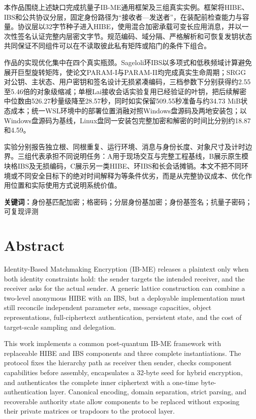 \documentclass[UTF8,a4paper,12pt,oneside,openany,fontset=fandol]{ctexrep}
\begin{document}
本作品围绕上述缺口完成抗量子IB-ME通用框架及三组真实实例。框架将HIBE、IBS和公共协议分层，固定身份路径为“接收者—发送者”，在装配前检查能力与容量。协议层以32字节种子进入HIBE，使用混合加密承载可变长应用消息，并以一次性签名认证完整内层密文字节。规范编码、域分隔、严格解析和可恢复发钥状态共同保证不同组件可以在不读取彼此私有矩阵或陷门的条件下组合。

作品的实现优化集中在四个真实瓶颈。Sageloli环IBS以多项式和低秩频域计算避免展开巨型旋转矩阵，使论文PARAM-I与PARAM-II均完成真实生命周期；SRGG对公钥、主状态、用户密钥和签名设计无损紧凑编码，三档参数下分别获得约2.55至5.46倍的对象级缩减；单根Lai接收会话实验复用已经验证的叶钥，把后续解密中位数由526.27秒量级降至28.57秒，同时如实保留509.55秒准备与约34.73 MiB状态成本；统一WSL环境中的部署位置消融对照Windows盘源码及两地安装包；以Windows盘源码为基线，Linux盘同一安装包完整加密和解密的时间比分别约18.87和4.59。

实验分别报告独立根、同根重复、运行环境、消息与身份长度、对象尺寸及计时边界。三组代表承担不同说明任务：A用于现场交互与完整工程基线，B展示原生模块格IBS及无损编码，C展示另一类HIBE、环IBS和长会话摊销。本文不把不同环境或不同安全目标下的绝对时间解释为等条件优劣，而是从完整协议成本、优化作用位置和实际使用方式说明系统价值。

\noindent\textbf{关键词：}身份基匹配加密；格密码；分层身份基加密；身份基签名；抗量子密码；可复现评测

\clearpage
\chapter*{Abstract}
\begingroup
\linespread{1.15}\selectfont
Identity-Based Matchmaking Encryption (IB-ME) releases a plaintext only when both identity constraints hold: the sender targets the intended receiver, and the receiver asks for the actual sender. A generic lattice construction can combine a two-level anonymous HIBE with an IBS, but a deployable implementation must still reconcile independent parameter sets, message capacities, object representations, full-ciphertext authentication, persistent state, and the cost of target-scale sampling and delegation.

This work implements a common post-quantum IB-ME framework with replaceable HIBE and IBS components and three complete instantiations. The protocol fixes the hierarchy path as receiver then sender, checks component capabilities before assembly, encapsulates a 32-byte seed for hybrid encryption, and authenticates the complete inner ciphertext with a one-time byte-authentication layer. Canonical encoding, domain separation, strict parsing, and recoverable authority state allow components to be replaced without exposing their private matrices or trapdoors to the protocol layer.
\end{document}
